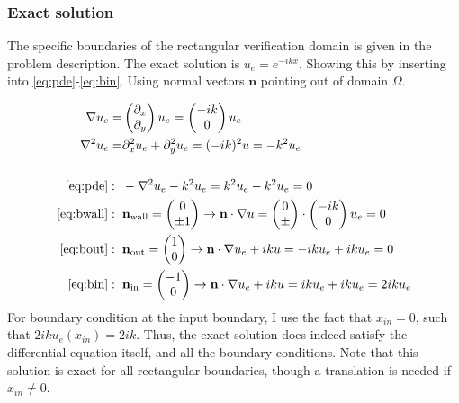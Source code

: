 \documentclass[aps, 12pt]{revtex4}
\begin{document}
\subsubsection{Exact solution}
The specific boundaries of the rectangular verification domain is given in the problem description. The exact solution is $u_e=e^{-ikx}$. Showing this by inserting into \eqref{eq:pde}-\eqref{eq:bin}. Using normal vectors $\mathbf{n}$ pointing out of domain $\Omega$.

\begin{align*}
    \nabla u_e =                   & \begin{pmatrix}
        \partial_x \\
        \partial_y
    \end{pmatrix} u_e = \begin{pmatrix}
        -ik \\ 0
    \end{pmatrix} u_e
    \\
    \nabla^2u_e =                  & \partial_x^2u_e + \partial_y^2u_e = (-ik)^2 u = -k^2u_e
    \\
    \\
    \eqref{eq:pde}: \hspace{2mm}   & -\nabla^2u_e-k^2u_e = k^2u_e - k^2u_e = 0
    \\
    \eqref{eq:bwall}: \hspace{2mm} & \mathbf{n}_{\text{wall}} = \begin{pmatrix}
        0 \\ \pm 1
    \end{pmatrix} \rightarrow \mathbf{n}\cdot \nabla u = \begin{pmatrix}
        0 \\ \pm
    \end{pmatrix}\cdot \begin{pmatrix}
        -ik \\ 0
    \end{pmatrix}u_e = 0
    \\
    \eqref{eq:bout}: \hspace{2mm}  & \mathbf{n}_{\text{out}} = \begin{pmatrix}
        1 \\ 0
    \end{pmatrix} \rightarrow \mathbf{n}\cdot \nabla u_e + iku = -iku_e + iku_e = 0
    \\
    \eqref{eq:bin}: \hspace{2mm}   & \mathbf{n}_{\text{in}} = \begin{pmatrix}
        -1 \\ 0
    \end{pmatrix} \rightarrow \mathbf{n}\cdot \nabla u_e + iku = iku_e + iku_e = 2iku_e
\end{align*}
For boundary condition at the input boundary, I use the fact that $x_{in}= 0$, such that $2iku_e(x_{in})= 2ik$. Thus, the exact solution does indeed satisfy the differential equation itself, and all the boundary conditions. Note that this solution is exact for all rectangular boundaries, though a translation is needed if $x_{in}\neq 0$.
\end{document}
